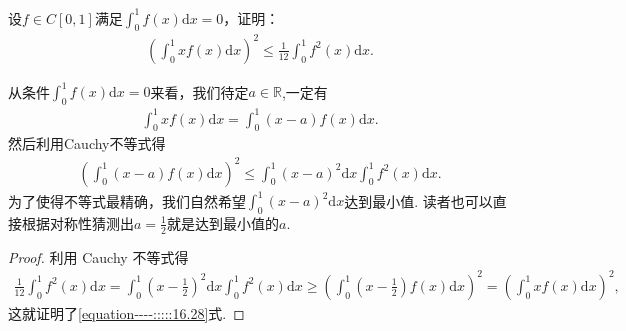 \documentclass[../../main.tex]{subfiles}%
\begin{document}
\begin{example}
设\(f \in C[0,1]\)满足\(\int_{0}^{1}f(x)\mathrm{d}x = 0\)，证明：
\begin{align}
\left(\int_{0}^{1}xf(x)\mathrm{d}x\right)^2 \leqslant \frac{1}{12}\int_{0}^{1}f^{2}(x)\mathrm{d}x. \label{equation----:::::16.28}
\end{align}
\end{example}
\begin{note}
从条件\(\int_{0}^{1}f(x)\mathrm{d}x = 0\)来看，我们待定\(a \in \mathbb{R}\),一定有
\begin{align*}
\int_{0}^{1}xf(x)\mathrm{d}x = \int_{0}^{1}(x - a)f(x)\mathrm{d}x.
\end{align*}
然后利用Cauchy不等式得
\begin{align*}
\left(\int_{0}^{1}(x - a)f(x)\mathrm{d}x\right)^2 \leqslant \int_{0}^{1}(x - a)^2\mathrm{d}x\int_{0}^{1}f^{2}(x)\mathrm{d}x.
\end{align*}
为了使得不等式最精确，我们自然希望\(\int_{0}^{1}(x - a)^2\mathrm{d}x\)达到最小值. 读者也可以直接根据对称性猜测出\(a = \frac{1}{2}\)就是达到最小值的\(a\).
\end{note}
\begin{proof}
利用 Cauchy 不等式得
\begin{align*}
\frac{1}{12}\int_{0}^{1}f^{2}(x)\mathrm{d}x=\int_{0}^{1}\left(x - \frac{1}{2}\right)^2\mathrm{d}x\int_{0}^{1}f^{2}(x)\mathrm{d}x\geqslant \left(\int_{0}^{1}\left(x - \frac{1}{2}\right)f(x)\mathrm{d}x\right)^2=\left(\int_{0}^{1}xf(x)\mathrm{d}x\right)^2,
\end{align*}
这就证明了\eqref{equation----:::::16.28}式.
\end{proof}
\end{document}
